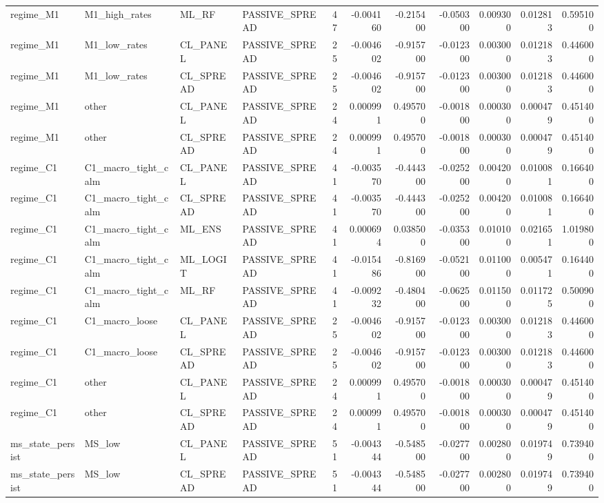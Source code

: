\begin{table}
\begin{tabular}{llllrrrrrrr}
regime_M1 & M1_high_rates & ML_RF & PASSIVE_SPREAD & 47 & -0.004160 & -0.215400 & -0.050300 & 0.009300 & 0.012813 & 0.595100 \\
regime_M1 & M1_low_rates & CL_PANEL & PASSIVE_SPREAD & 25 & -0.004602 & -0.915700 & -0.012300 & 0.003000 & 0.012183 & 0.446000 \\
regime_M1 & M1_low_rates & CL_SPREAD & PASSIVE_SPREAD & 25 & -0.004602 & -0.915700 & -0.012300 & 0.003000 & 0.012183 & 0.446000 \\
regime_M1 & other & CL_PANEL & PASSIVE_SPREAD & 24 & 0.000991 & 0.495700 & -0.001800 & 0.000300 & 0.000479 & 0.451400 \\
regime_M1 & other & CL_SPREAD & PASSIVE_SPREAD & 24 & 0.000991 & 0.495700 & -0.001800 & 0.000300 & 0.000479 & 0.451400 \\
regime_C1 & C1_macro_tight_calm & CL_PANEL & PASSIVE_SPREAD & 41 & -0.003570 & -0.444300 & -0.025200 & 0.004200 & 0.010081 & 0.166400 \\
regime_C1 & C1_macro_tight_calm & CL_SPREAD & PASSIVE_SPREAD & 41 & -0.003570 & -0.444300 & -0.025200 & 0.004200 & 0.010081 & 0.166400 \\
regime_C1 & C1_macro_tight_calm & ML_ENS & PASSIVE_SPREAD & 41 & 0.000694 & 0.038500 & -0.035300 & 0.010100 & 0.021651 & 1.019800 \\
regime_C1 & C1_macro_tight_calm & ML_LOGIT & PASSIVE_SPREAD & 41 & -0.015486 & -0.816900 & -0.052100 & 0.011000 & 0.005471 & 0.164400 \\
regime_C1 & C1_macro_tight_calm & ML_RF & PASSIVE_SPREAD & 41 & -0.009232 & -0.480400 & -0.062500 & 0.011500 & 0.011725 & 0.500900 \\
regime_C1 & C1_macro_loose & CL_PANEL & PASSIVE_SPREAD & 25 & -0.004602 & -0.915700 & -0.012300 & 0.003000 & 0.012183 & 0.446000 \\
regime_C1 & C1_macro_loose & CL_SPREAD & PASSIVE_SPREAD & 25 & -0.004602 & -0.915700 & -0.012300 & 0.003000 & 0.012183 & 0.446000 \\
regime_C1 & other & CL_PANEL & PASSIVE_SPREAD & 24 & 0.000991 & 0.495700 & -0.001800 & 0.000300 & 0.000479 & 0.451400 \\
regime_C1 & other & CL_SPREAD & PASSIVE_SPREAD & 24 & 0.000991 & 0.495700 & -0.001800 & 0.000300 & 0.000479 & 0.451400 \\
ms_state_persist & MS_low & CL_PANEL & PASSIVE_SPREAD & 51 & -0.004344 & -0.548500 & -0.027700 & 0.002800 & 0.019749 & 0.739400 \\
ms_state_persist & MS_low & CL_SPREAD & PASSIVE_SPREAD & 51 & -0.004344 & -0.548500 & -0.027700 & 0.002800 & 0.019749 & 0.739400 \\

\end{tabular}
\end{table}
